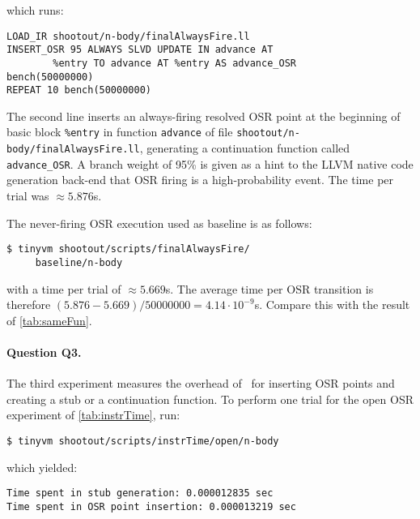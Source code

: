 \noindent which runs:

\begin{small}
\begin{verbatim}
LOAD_IR shootout/n-body/finalAlwaysFire.ll
INSERT_OSR 95 ALWAYS SLVD UPDATE IN advance AT 
        %entry TO advance AT %entry AS advance_OSR
bench(50000000)
REPEAT 10 bench(50000000)
\end{verbatim}
\end{small}

\noindent The second line inserts an always-firing resolved OSR point at the beginning of basic block {\tt \%entry} in function {\tt advance} of file {\small\tt shootout/n-body/finalAlwaysFire.ll}, generating a continuation function called {\tt advance\_OSR}. A branch weight of 95\% is given as a hint to the LLVM native code generation back-end that OSR firing is a high-probability event. The time per trial was $\approx5.876$s.

The never-firing OSR execution used as baseline is as follows:
\begin{small}
\begin{verbatim}
$ tinyvm shootout/scripts/finalAlwaysFire/
     baseline/n-body
\end{verbatim}
\end{small}

\noindent with a time per trial of $\approx5.669$s. The average time per OSR transition is therefore $(5.876-5.669)/50000000=4.14\cdot 10^{-9}$s. Compare this with the result of \ref{tab:sameFun}.

\paragraph{Question Q3.} The third experiment measures the overhead of \osrkit\ for inserting OSR points and creating a stub or a continuation function. To perform one trial for the open OSR experiment of \ref{tab:instrTime}, run:
\begin{small}
\begin{verbatim}
$ tinyvm shootout/scripts/instrTime/open/n-body
\end{verbatim}
\end{small}
\noindent which yielded:
\begin{small}
\begin{verbatim}
Time spent in stub generation: 0.000012835 sec
Time spent in OSR point insertion: 0.000013219 sec
\end{verbatim}
\end{small}

